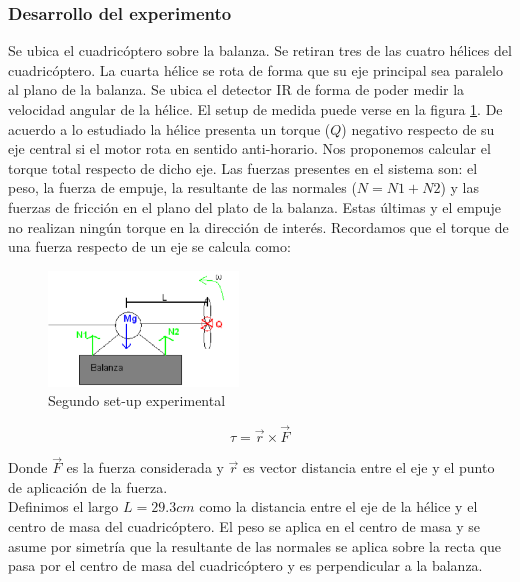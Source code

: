 \documentclass[main]{subfiles}
\begin{document}
\subsubsection*{Desarrollo del experimento}
\label{sub:torque}
Se ubica el cuadric\'optero sobre la balanza. Se retiran tres de las cuatro h\'elices del cuadric\'optero. La cuarta h\'elice se rota de forma que su eje principal sea paralelo al plano de la balanza. Se ubica el detector IR de forma de poder medir la velocidad angular de la h\'elice. El setup de medida puede verse en la figura \ref{fig:setup2}. De acuerdo a lo estudiado la h\'elice presenta un torque ($Q$) negativo respecto de su eje central si el motor rota en sentido anti-horario. Nos proponemos calcular el torque total respecto de dicho eje. Las fuerzas presentes en el sistema son: el peso, la fuerza de empuje, la resultante de las normales ($N = N1+N2$) y las fuerzas de fricci\'on en el plano del plato de la balanza. Estas \'ultimas y el empuje no realizan ning\'un torque en la direcci\'on de inter\'es. Recordamos que el torque de una fuerza respecto de un eje se calcula como:
\begin{figure}
  \vspace{0pt}
  \begin{center}
    \includegraphics[width=0.45\textwidth]{./pics_motores/set2.pdf}
  \end{center}
  \vspace{-15pt}
  \caption{Segundo set-up experimental}
  \label{fig:setup2}
  \vspace{10pt}
\end{figure}
\begin{equation}
\tau=\vec{r} \times \vec{F} 
\end{equation}

Donde $\vec{F}$ es la fuerza considerada y $\vec{r}$ es vector distancia entre el eje y el punto de aplicaci\'on de la fuerza.\\

Definimos el largo $L=29.3cm$ como la distancia entre el eje de la h\'elice y el centro de masa del cuadric\'optero. El peso se aplica en el centro de masa y se asume por simetr\'ia que la resultante de las normales se aplica sobre la recta que pasa por el centro de masa del cuadric\'optero y es perpendicular a la balanza. 
\end{document}
